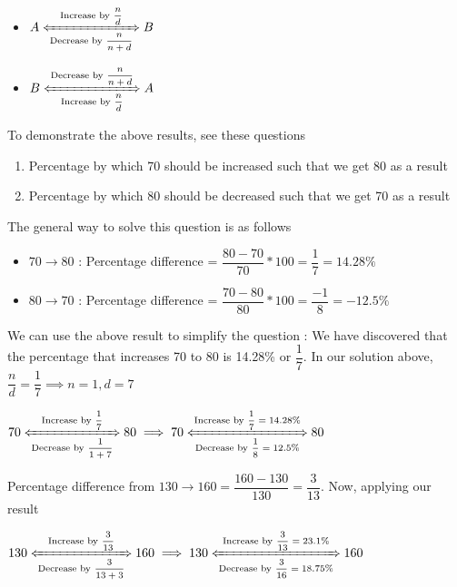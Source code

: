 \begin{itemize}
    \item $A \xLeftrightarrow[\text{Decrease by $\dfrac{n}{n+d}$}]{\text{Increase by $\dfrac{n}{d}$}} B$

    \item $B \xLeftrightarrow[\text{Increase by $\dfrac{n}{d}$}]{\text{Decrease by $\dfrac{n}{n+d}$}} A$ 

\end{itemize}

To demonstrate the above results, see these questions

\begin{enumerate}
    \item Percentage by which 70 should be increased such that we get 80 as a result
    \item Percentage by which 80 should be decreased such that we get 70 as a result
\end{enumerate}

The general way to solve this question is as follows
\begin{itemize}
    \item $70 \xrightarrow{} 80$ : Percentage difference = $\dfrac{80 - 70}{70} * 100 = \dfrac{1}{7} = 14.28\%$

    \item $80 \xrightarrow{} 70$ : Percentage difference = $\dfrac{70 - 80}{80} * 100 = \dfrac{-1}{8} = -12.5\%$
\end{itemize}

We can use the above result to simplify the question : We have discovered that the percentage that increases 70 to 80 is 14.28\% or $\dfrac{1}{7}$. In our solution above, $\dfrac{n}{d} = \dfrac{1}{7} \implies n = 1, d = 7$

$70 \xLeftrightarrow[\text{Decrease by $\dfrac{1}{1+7}$}]{\text{Increase by $\dfrac{1}{7}$}} 80 \implies 70 \xLeftrightarrow[\text{Decrease by $\dfrac{1}{8} = 12.5\%$}]{\text{Increase by $\dfrac{1}{7} = 14.28\%$}} 80 $


Percentage difference from $130 \xrightarrow{} 160 = \dfrac{160 - 130}{130} = \dfrac{3}{13}$. Now, applying our result

$130 \xLeftrightarrow[\text{Decrease by $\dfrac{3}{13 + 3}$}]{\text{Increase by $\dfrac{3}{13}$}} 160 \implies 130 \xLeftrightarrow[\text{Decrease by $\dfrac{3}{16} = 18.75\% $}]{\text{Increase by $\dfrac{3}{13} = 23.1\%$}} 160$

